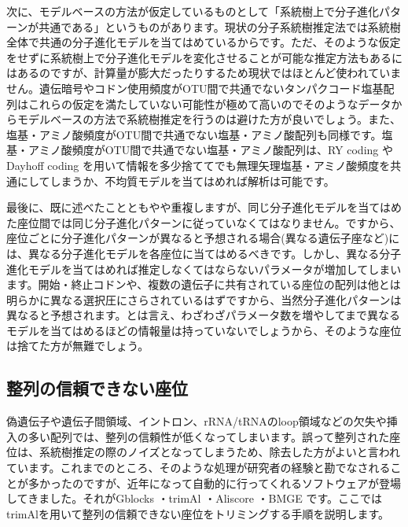 \documentclass[titlepage,10pt,a4paper]{jsbook}
\begin{document}
次に、モデルベースの方法が仮定しているものとして「系統樹上で分子進化パターンが共通である」というものがあります。現状の分子系統樹推定法では系統樹全体で共通の分子進化モデルを当てはめているからです。ただ、そのような仮定をせずに系統樹上で分子進化モデルを変化させることが可能な推定方法もあるにはある\citep[例えば][など]{Boussau2006,Blanquart2006,Blanquart2008}のですが、計算量が膨大だったりするため現状ではほとんど使われていません。遺伝暗号やコドン使用頻度がOTU間で共通でないタンパクコード塩基配列はこれらの仮定を満たしていない可能性が極めて高いのでそのようなデータからモデルベースの方法で系統樹推定を行うのは避けた方が良いでしょう。また、塩基・アミノ酸頻度がOTU間で共通でない塩基・アミノ酸配列も同様です。塩基・アミノ酸頻度がOTU間で共通でない塩基・アミノ酸配列は、RY coding \citep{Woese1991}やDayhoff coding \citep{Hrdy2004}を用いて情報を多少捨ててでも無理矢理塩基・アミノ酸頻度を共通にしてしまうか、不均質モデル\citep{Blanquart2006,Blanquart2008}を当てはめれば解析は可能です。

最後に、既に述べたことともやや重複しますが、同じ分子進化モデルを当てはめた座位間では同じ分子進化パターンに従っていなくてはなりません。ですから、座位ごとに分子進化パターンが異なると予想される場合(異なる遺伝子座など)には、異なる分子進化モデルを各座位に当てはめるべきです。しかし、異なる分子進化モデルを当てはめれば推定しなくてはならないパラメータが増加してしまいます。開始・終止コドンや、複数の遺伝子に共有されている座位の配列は他とは明らかに異なる選択圧にさらされているはずですから、当然分子進化パターンは異なると予想されます。とは言え、わざわざパラメータ数を増やしてまで異なるモデルを当てはめるほどの情報量は持っていないでしょうから、そのような座位は捨てた方が無難でしょう。

\subsection{整列の信頼できない座位}

偽遺伝子や遺伝子間領域、イントロン、rRNA/tRNAのloop領域などの欠失や挿入の多い配列では、整列の信頼性が低くなってしまいます。誤って整列された座位は、系統樹推定の際のノイズとなってしまうため、除去した方がよいと言われています\citep{Talavera2007}。これまでのところ、そのような処理が研究者の経験と勘でなされることが多かったのですが、近年になって自動的に行ってくれるソフトウェアが登場してきました。それがGblocks \citep{Castresana2000}・trimAl \citep{Capella-Gutierrez2009}・Aliscore \citep{Misof2009}・BMGE \citep{Criscuolo2010}です。ここではtrimAlを用いて整列の信頼できない座位をトリミングする手順を説明します。
\end{document}
